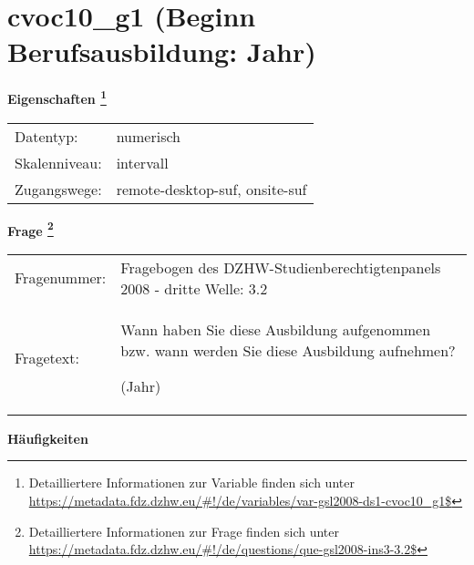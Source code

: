 
    \setcounter{footnote}{0}

    \vspace*{-1.8cm}
	\section{cvoc10\_g1 (Beginn Berufsausbildung: Jahr)}
	\label{section:cvoc10_g1}



    \vspace*{0.5cm}
    \noindent\textbf{Eigenschaften
	\footnote{Detailliertere Informationen zur Variable finden sich unter
		\url{https://metadata.fdz.dzhw.eu/\#!/de/variables/var-gsl2008-ds1-cvoc10_g1$}}}\\
	\begin{tabularx}{\hsize}{@{}lX}
	Datentyp: & numerisch \\
	Skalenniveau: & intervall \\
	Zugangswege: &
	  remote-desktop-suf, 
	  onsite-suf
 \\
    \end{tabularx}



				\vspace*{0.5cm}
                \noindent\textbf{Frage
	                \footnote{Detailliertere Informationen zur Frage finden sich unter
		              \url{https://metadata.fdz.dzhw.eu/\#!/de/questions/que-gsl2008-ins3-3.2$}}}\\
				\begin{tabularx}{\hsize}{@{}lX}
					Fragenummer: &
					  Fragebogen des DZHW-Studienberechtigtenpanels 2008 - dritte Welle:
					  3.2
 \\
					Fragetext: & Wann haben Sie diese Ausbildung aufgenommen bzw. wann werden Sie diese Ausbildung aufnehmen?\par  (Jahr) \\
				\end{tabularx}





        		\vspace*{0.5cm}
                \noindent\textbf{Häufigkeiten}

